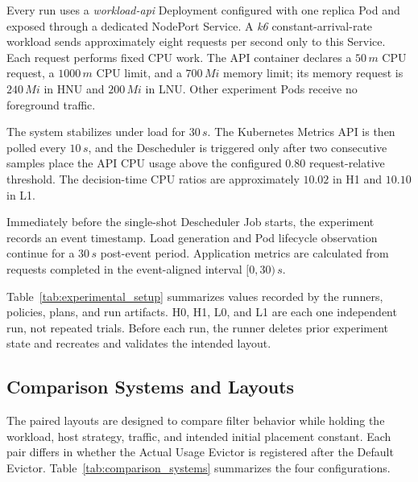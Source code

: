 Every run uses a \textit{workload-api} Deployment configured with one replica
Pod and exposed through a dedicated NodePort Service. A \textit{k6}
constant-arrival-rate workload sends approximately eight requests per second
only to this Service. Each request performs fixed CPU work. The API container
declares a \(50\,m\) CPU request, a \(1000\,m\) CPU limit, and a \(700\,Mi\)
memory limit; its memory request is \(240\,Mi\) in HNU and \(200\,Mi\) in LNU.
Other experiment Pods receive no foreground traffic.

The system stabilizes under load for \(30\,s\). The Kubernetes Metrics API is
then polled every \(10\,s\), and the Descheduler is triggered only after two
consecutive samples place the API CPU usage above the configured
\(0.80\) request-relative threshold. The decision-time CPU ratios are
approximately \(10.02\) in H1 and \(10.10\) in L1.

Immediately before the single-shot Descheduler Job starts, the experiment
records an event timestamp. Load generation and Pod lifecycle observation
continue for a \(30\,s\) post-event period. Application metrics are calculated
from requests completed in the event-aligned interval \([0,30)\,s\).

Table~\ref{tab:experimental_setup} summarizes values recorded by the runners,
policies, plans, and run artifacts. H0, H1, L0, and L1 are each one independent
run, not repeated trials. Before each run, the runner deletes prior experiment
state and recreates and validates the intended layout.

\subsection{Comparison Systems and Layouts}

The paired layouts are designed to compare filter behavior while holding the
workload, host strategy, traffic, and intended initial placement constant.
Each pair differs in whether the Actual Usage Evictor is registered after the
Default Evictor. Table~\ref{tab:comparison_systems} summarizes the four
configurations.

